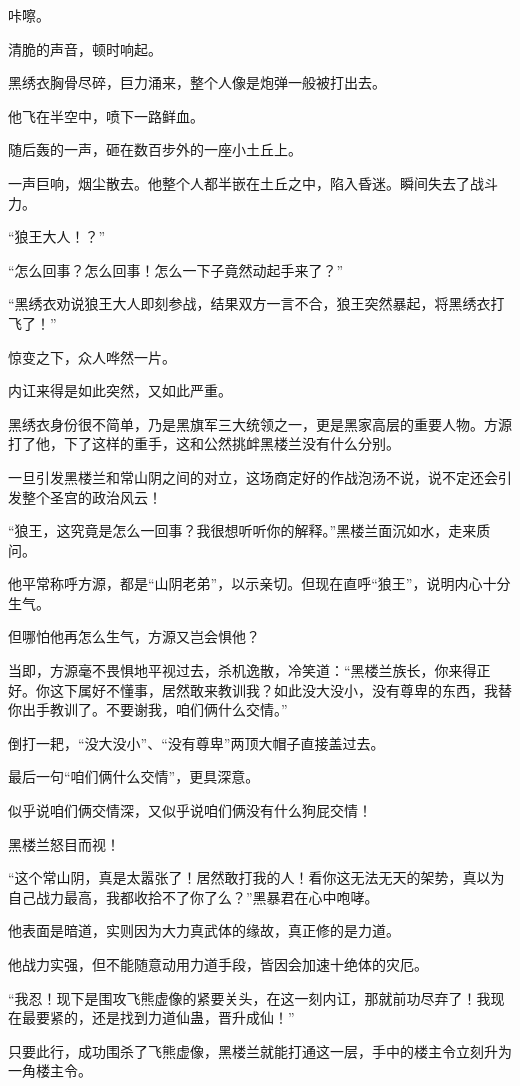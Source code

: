 \begin{this_body}
咔嚓。

清脆的声音，顿时响起。

黑绣衣胸骨尽碎，巨力涌来，整个人像是炮弹一般被打出去。

他飞在半空中，喷下一路鲜血。

随后轰的一声，砸在数百步外的一座小土丘上。

一声巨响，烟尘散去。他整个人都半嵌在土丘之中，陷入昏迷。瞬间失去了战斗力。

“狼王大人！？”

“怎么回事？怎么回事！怎么一下子竟然动起手来了？”

“黑绣衣劝说狼王大人即刻参战，结果双方一言不合，狼王突然暴起，将黑绣衣打飞了！”

惊变之下，众人哗然一片。

内讧来得是如此突然，又如此严重。

黑绣衣身份很不简单，乃是黑旗军三大统领之一，更是黑家高层的重要人物。方源打了他，下了这样的重手，这和公然挑衅黑楼兰没有什么分别。

一旦引发黑楼兰和常山阴之间的对立，这场商定好的作战泡汤不说，说不定还会引发整个圣宫的政治风云！

“狼王，这究竟是怎么一回事？我很想听听你的解释。”黑楼兰面沉如水，走来质问。

他平常称呼方源，都是“山阴老弟”，以示亲切。但现在直呼“狼王”，说明内心十分生气。

但哪怕他再怎么生气，方源又岂会惧他？

当即，方源毫不畏惧地平视过去，杀机逸散，冷笑道：“黑楼兰族长，你来得正好。你这下属好不懂事，居然敢来教训我？如此没大没小，没有尊卑的东西，我替你出手教训了。不要谢我，咱们俩什么交情。”

倒打一耙，“没大没小”、“没有尊卑”两顶大帽子直接盖过去。

最后一句“咱们俩什么交情”，更具深意。

似乎说咱们俩交情深，又似乎说咱们俩没有什么狗屁交情！

黑楼兰怒目而视！

“这个常山阴，真是太嚣张了！居然敢打我的人！看你这无法无天的架势，真以为自己战力最高，我都收拾不了你了么？”黑暴君在心中咆哮。

他表面是暗道，实则因为大力真武体的缘故，真正修的是力道。

他战力实强，但不能随意动用力道手段，皆因会加速十绝体的灾厄。

“我忍！现下是围攻飞熊虚像的紧要关头，在这一刻内讧，那就前功尽弃了！我现在最要紧的，还是找到力道仙蛊，晋升成仙！”

只要此行，成功围杀了飞熊虚像，黑楼兰就能打通这一层，手中的楼主令立刻升为一角楼主令。


\end{this_body}
